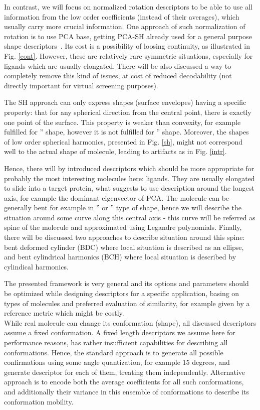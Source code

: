 \documentclass[10pt,journal]{IEEEtranTCOM}
\theoremstyle{plain}
\begin{document}
In contrast, we will focus on normalized rotation descriptors to be able to use all information from the low order coefficients (instead of their averages), which usually carry more crucial information. One approach of such normalization of rotation is to use PCA base, getting PCA-SH already used for a general purpose shape descriptors~\cite{PCAharm}. Its cost is a possibility of loosing continuity, as illustrated in Fig. \ref{cont}. However, these are relatively rare symmetric situations, especially for ligands which are usually elongated. There will be also discussed a way to completely remove this kind of issues, at cost of reduced decodability (not directly important for virtual screening purposes).

The SH approach can only express shapes (surface envelopes) having a specific property: that for any spherical direction from the central point, there is exactly one point of the surface. This property is weaker than convexity, for example fulfilled for '' shape, however it is not fulfilled for '' shape. Moreover, the shapes of low order spherical harmonics, presented in Fig. \ref{sh}, might not correspond well to the actual shape of molecule, leading to artifacts as in Fig. \ref{intr}.

Hence, there will by introduced descriptors which should be more appropriate for probably the most interesting molecules here: ligands. They are usually elongated to slide into a target protein, what suggests to use description around the longest axis, for example the dominant eigenvector of PCA. The molecule can be generally bent for example in '' or '' type of shape, hence we will describe the situation around some curve along this central axis - this curve will be referred as spine of the molecule and approximated using Legandre polynomials. Finally, there will be discussed two approaches to describe situation around this spine: bent deformed cylinder (BDC) where local situation is described as an ellipse, and bent cylindrical harmonics (BCH) where local situation is described by cylindical harmonics.

The presented framework is very general and its options and parameters should be optimized while designing descriptors for a specific application, basing on types of molecules and preferred evaluation of similarity, for example given by a reference metric which might be costly.\\

While real molecule can change its conformation (shape), all discussed descriptors assume a fixed conformation. A fixed length descriptors we assume here for performance reasons, has rather insufficient capabilities for describing all conformations. Hence, the standard approach is to generate all possible confirmations using some angle quantization, for example 15 degrees, and generate descriptor for each of them, treating them independently. Alternative approach is to encode both the average coefficients for all such conformations, and additionally their variance in this ensemble of conformations to describe its conformation mobility.
\end{document}
